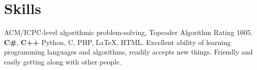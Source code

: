 \documentclass[10pt,a4paper,roman]{moderncv} %
\begin{document}
\section{Skills}
       {ACM/ICPC-level algorithmic problem-solving, Topcoder Algorithm Rating 1605\footnotemark[4]{}.}
       {\textbf{C\#}, \textbf{C++}\newline{}%
        Python, C, PHP, \LaTeX, HTML.}
       {Excellent ability of learning programming languages and algorithms, readily accepts new things.\newline{}%
        Friendly and easily getting along with other people.}
\end{document}
